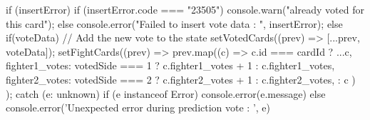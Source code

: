 {{{        if (insertError) {
          if (insertError.code === "23505") {
            console.warn("already voted for this card");
          } else {
            console.error("Failed to insert vote data : ", insertError);
          }
        } else if(voteData) {
          // Add the new vote to the state
          setVotedCards((prev) => [...prev, voteData]);
          setFightCards((prev) =>
            prev.map((c) =>
              c.id === cardId
                ? {
                    ...c,
                    fighter1_votes:
                      votedSide === 1 ? c.fighter1_votes + 1 : c.fighter1_votes,
                    fighter2_votes:
                      votedSide === 2 ? c.fighter2_votes + 1 : c.fighter2_votes,
                  }
                : c
            )
          );
        }
      }
    } catch (e: unknown) {
      if (e instanceof Error) {
        console.error(e.message)
      } else {
        console.error('Unexpected error during prediction vote : ', e)
      }
    }
  }